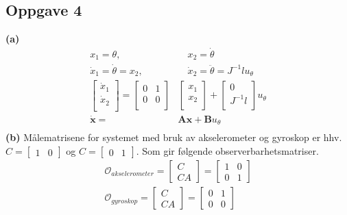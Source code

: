 \documentclass[11pt, a4paper, norsk]{rapport1} %
\begin{document}
\subsection{Oppgave 4}
\textbf{(a)} 
\begin{equation}
    \begin{aligned}
    x_1 = \theta, &\quad x_2 = \dot{\theta} \\
    \dot{x}_1 = \dot{\theta} = x_2, &\quad \dot{x}_2 = \ddot{\theta} = J^{-1}lu_{\theta} \\
    \begin{bmatrix}
        \dot{x}_1 \\
        \dot{x}_2 \\
    \end{bmatrix} = 
    \begin{bmatrix}
        0 & 1 \\
        0 & 0 \\
    \end{bmatrix}&
    \begin{bmatrix}
        x_1 \\
        x_2 \\
    \end{bmatrix} + 
    \begin{bmatrix}
        0 \\
        J^{-1}l \\
    \end{bmatrix}u_{\theta} \\
    \mathbf{\dot{x}} = &\mathbf{Ax} + \mathbf{B}u_{\theta} \\
    \end{aligned}
\end{equation}
\textbf{(b)}
Målematrisene for systemet med bruk av akselerometer og gyroskop er hhv. $ C = \begin{bmatrix} 1 & 0 \end{bmatrix}$ og $C = \begin{bmatrix} 0 & 1 \end{bmatrix}$.
Som gir følgende observerbarhetsmatriser.
\begin{equation}
    \begin{aligned}
        \mathcal{O}_{akselerometer} = \begin{bmatrix} C \\ CA \end{bmatrix} = \begin{bmatrix} 1 & 0 \\ 0 & 1 \end{bmatrix} \\
        \mathcal{O}_{gyroskop} = \begin{bmatrix} C \\ CA \end{bmatrix} = \begin{bmatrix} 0 & 1 \\ 0 & 0 \end{bmatrix} \\
    \end{aligned}
\end{equation}
\end{document}
